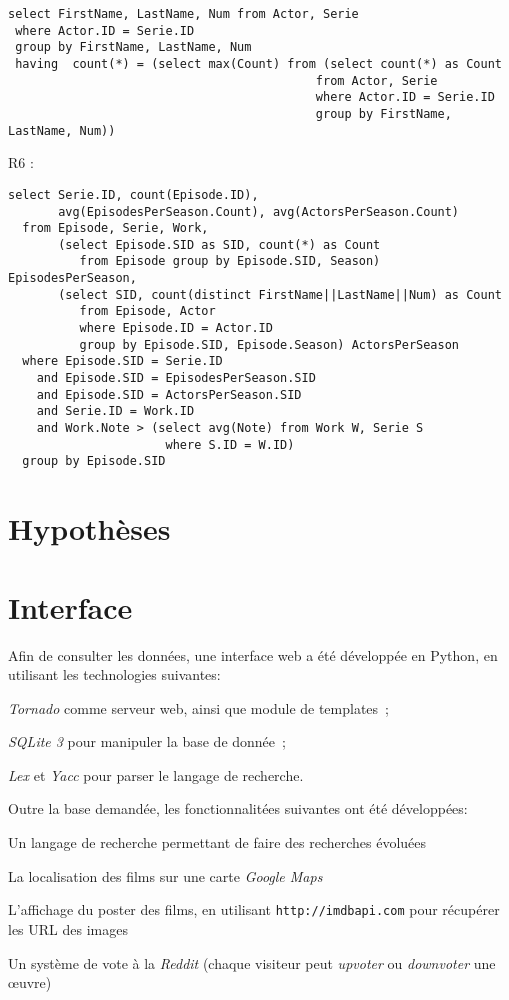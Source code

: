 \documentclass[a4paper,12pt]{article}
\begin{document}
\begin{list}{-}{}
    \begin{lstlisting}
select FirstName, LastName, Num from Actor, Serie
 where Actor.ID = Serie.ID
 group by FirstName, LastName, Num
 having  count(*) = (select max(Count) from (select count(*) as Count
                                           from Actor, Serie
                                           where Actor.ID = Serie.ID
                                           group by FirstName, LastName, Num))
    \end{lstlisting}
  \item R6 :
    \begin{lstlisting}
select Serie.ID, count(Episode.ID), 
       avg(EpisodesPerSeason.Count), avg(ActorsPerSeason.Count)
  from Episode, Serie, Work,
       (select Episode.SID as SID, count(*) as Count
          from Episode group by Episode.SID, Season) EpisodesPerSeason,
       (select SID, count(distinct FirstName||LastName||Num) as Count
          from Episode, Actor
          where Episode.ID = Actor.ID
          group by Episode.SID, Episode.Season) ActorsPerSeason
  where Episode.SID = Serie.ID
    and Episode.SID = EpisodesPerSeason.SID
    and Episode.SID = ActorsPerSeason.SID
    and Serie.ID = Work.ID
    and Work.Note > (select avg(Note) from Work W, Serie S
                      where S.ID = W.ID)
  group by Episode.SID
\end{lstlisting}
\section{Hypothèses}
\section{Interface}
Afin de consulter les données, une interface web a été développée en
Python, en utilisant les technologies suivantes:
\begin{list}{-}{}
  \item \emph{Tornado} comme serveur web, ainsi que module de templates~;
  \item \emph{SQLite 3} pour manipuler la base de donnée~;
  \item \emph{Lex} et \emph{Yacc} pour parser le langage de recherche.
\end{list}

Outre la base demandée, les fonctionnalitées suivantes ont été développées:
\begin{list}{-}{}
  \item Un langage de recherche permettant de faire des recherches évoluées
  \item La localisation des films sur une carte \emph{Google Maps}
  \item L'affichage du poster des films, en utilisant
    \texttt{http://imdbapi.com} pour récupérer les URL des images
  \item Un système de vote à la \emph{Reddit} (chaque visiteur peut
    \emph{upvoter} ou \emph{downvoter} une œuvre)
\end{list}

\end{list}
\end{document}
